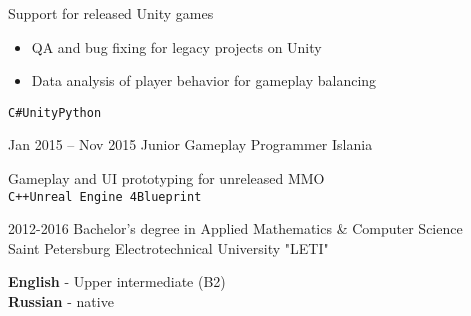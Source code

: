 \documentclass[9pt]{developercv} %
\begin{document}
\begin{entrylist}
{	Support for released Unity games
	\begin{itemize}
		\item QA and bug fixing for legacy projects on Unity
		\item Data analysis of player behavior for gameplay balancing
	\end{itemize}
	{\texttt{C\#}\slashsep\texttt{Unity}\slashsep\texttt{Python}}
	}
	\entry
	{Jan 2015 -- Nov 2015}
	{Junior Gameplay Programmer}
	{Islania}
	{

	Gameplay and UI prototyping for unreleased MMO \\ {\texttt{C++}\slashsep\texttt{Unreal Engine 4}\slashsep\texttt{Blueprint}}
	}
\end{entrylist}



\begin{entrylist}
	\entry
	{2012-2016}
	{Bachelor's degree in Applied Mathematics \& Computer Science \\ \footnotesize{Saint Petersburg Electrotechnical University "LETI"} }
	{}
	{}
\end{entrylist}


\begin{minipage}[t]{0.5\textwidth}
	\vspace{-\baselineskip} %


	\textbf{English} - Upper intermediate (B2)\\
	\textbf{Russian} - native
\end{minipage}
\hfill

\end{document}
